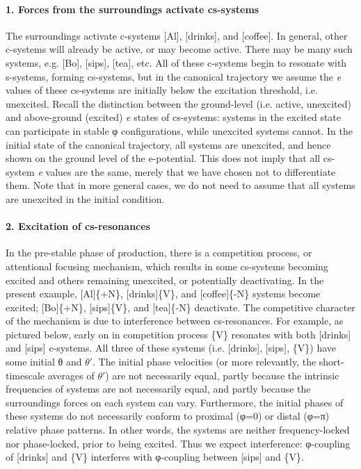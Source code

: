 \paragraph{{1. Forces from the surroundings activate cs-systems}} 

The surroundings activate c-systems [Al], [drinks], and [coffee]. In general, other c-systems will already be active, or may become active. There may be many such systems, e.g. [Bo], [sips], [tea], etc. All of these c-systems begin to resonate with s-systems, forming cs-systems, but in the canonical trajectory we assume the \textit{e} values of these cs-systems are initially below the excitation threshold, i.e. unexcited. Recall the distinction between the ground-level (i.e. active, unexcited) and above-ground (excited) \textit{e} states of cs-systems: systems in the excited state can participate in stable φ configurations, while unexcited systems cannot. In the initial state of the canonical trajectory, all systems are unexcited, and hence shown on the ground level of the e-potential. This does not imply that all cs-system \textit{e} values are the same, merely that we have chosen not to differentiate them. Note that in more general cases, we do not need to assume that all systems are unexcited in the initial condition.

\paragraph{2. Excitation of cs-resonances}

In the pre-stable phase of production, there is a competition process, or attentional focusing mechanism, which results in some cs-systems becoming excited and others remaining unexcited, or potentially deactivating. In the present example, [Al]\{+N\}, [drinks]\{V\}, and [coffee]\{-N\} systems become excited; [Bo]\{+N\}, [sips]\{V\}, and [tea]\{-N\} deactivate. The competitive character of the mechanism is due to interference between cs-resonances. For example, as pictured below, early on in competition process \{V\} resonates with both [drinks] and [sips] c-systems. All three of these systems (i.e. [drinks], [sips], \{V\}) have some initial θ and $\theta ′$. The initial phase velocities (or more relevantly, the short-timescale averages of $\theta ′$) are not necessarily equal, partly because the intrinsic frequencies of systems are not necessarily equal, and partly because the surroundings forces on each system can vary. Furthermore, the initial phases of these systems do not necessarily conform to proximal (φ=0) or distal (φ=π) relative phase patterns. In other words, the systems are neither frequency-locked nor phase-locked, prior to being excited. Thus we expect interference: φ{}-coupling of [drinks] and \{V\} interferes with φ{}-coupling between [sips] and \{V\}.

